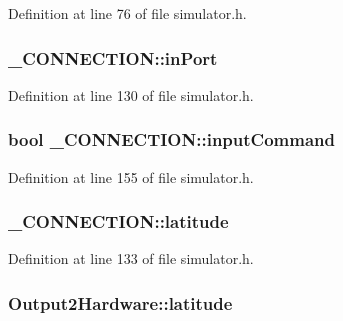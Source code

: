 Definition at line 76 of file simulator.\-h.

\hypertarget{group___h_i_t_l_plugin_gabf3d6472bdcac5895a53143e1f84fb09}{
\subsubsection[{in\-Port}]{ \-\_\-\-C\-O\-N\-N\-E\-C\-T\-I\-O\-N\-::in\-Port}}\label{group___h_i_t_l_plugin_gabf3d6472bdcac5895a53143e1f84fb09}


Definition at line 130 of file simulator.\-h.

\hypertarget{group___h_i_t_l_plugin_gaef59cc30b3dc3c996cfba35065d250bd}{
\subsubsection[{input\-Command}]{\setlength{\rightskip}{0pt plus 5cm}bool \-\_\-\-C\-O\-N\-N\-E\-C\-T\-I\-O\-N\-::input\-Command}}\label{group___h_i_t_l_plugin_gaef59cc30b3dc3c996cfba35065d250bd}


Definition at line 155 of file simulator.\-h.

\hypertarget{group___h_i_t_l_plugin_gac06d25b8e020f633a60fadb7e7eedfa9}{
\subsubsection[{latitude}]{ \-\_\-\-C\-O\-N\-N\-E\-C\-T\-I\-O\-N\-::latitude}}\label{group___h_i_t_l_plugin_gac06d25b8e020f633a60fadb7e7eedfa9}


Definition at line 133 of file simulator.\-h.

\hypertarget{group___h_i_t_l_plugin_ga3f453b19b12f4264ebffe76a1e8ee93d}{
\subsubsection[{latitude}]{ Output2\-Hardware\-::latitude}}\label{group___h_i_t_l_plugin_ga3f453b19b12f4264ebffe76a1e8ee93d}


